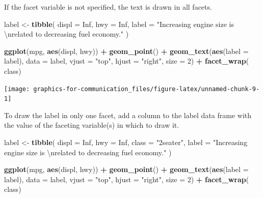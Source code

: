 \documentclass[]{book}
\newenvironment{Shaded}{\begin{snugshade}}{\end{snugshade}}
\newcommand{\CharTok}[1]{\textcolor[rgb]{0.31,0.60,0.02}{#1}}
\newcommand{\DataTypeTok}[1]{\textcolor[rgb]{0.13,0.29,0.53}{#1}}
\newcommand{\DecValTok}[1]{\textcolor[rgb]{0.00,0.00,0.81}{#1}}
\newcommand{\KeywordTok}[1]{\textcolor[rgb]{0.13,0.29,0.53}{\textbf{#1}}}
\newcommand{\NormalTok}[1]{#1}
\newcommand{\OperatorTok}[1]{\textcolor[rgb]{0.81,0.36,0.00}{\textbf{#1}}}
\newcommand{\OtherTok}[1]{\textcolor[rgb]{0.56,0.35,0.01}{#1}}
\newcommand{\StringTok}[1]{\textcolor[rgb]{0.31,0.60,0.02}{#1}}
\theoremstyle{plain}
\theoremstyle{remark}
\begin{document}
If the facet variable is not specified, the text is drawn in all facets.

\begin{Shaded}
\begin{Highlighting}[]
\NormalTok{label <-}\StringTok{ }\KeywordTok{tibble}\NormalTok{(}
  \DataTypeTok{displ =} \OtherTok{Inf}\NormalTok{,}
  \DataTypeTok{hwy =} \OtherTok{Inf}\NormalTok{,}
  \DataTypeTok{label =} \StringTok{"Increasing engine size is }\CharTok{\textbackslash{}n}\StringTok{related to decreasing fuel economy."}
\NormalTok{)}

\KeywordTok{ggplot}\NormalTok{(mpg, }\KeywordTok{aes}\NormalTok{(displ, hwy)) }\OperatorTok{+}
\StringTok{  }\KeywordTok{geom_point}\NormalTok{() }\OperatorTok{+}
\StringTok{  }\KeywordTok{geom_text}\NormalTok{(}\KeywordTok{aes}\NormalTok{(}\DataTypeTok{label =}\NormalTok{ label), }\DataTypeTok{data =}\NormalTok{ label, }\DataTypeTok{vjust =} \StringTok{"top"}\NormalTok{, }\DataTypeTok{hjust =} \StringTok{"right"}\NormalTok{,}
            \DataTypeTok{size =} \DecValTok{2}\NormalTok{) }\OperatorTok{+}
\StringTok{  }\KeywordTok{facet_wrap}\NormalTok{(}\OperatorTok{~}\StringTok{ }\NormalTok{class)}
\end{Highlighting}
\end{Shaded}

\begin{center}\texttt{[image: graphics-for-communication\_files/figure-latex/unnamed-chunk-9-1]} \end{center}

To draw the label in only one facet, add a column to the label data frame with the value of the faceting variable(s) in which to draw it.

\begin{Shaded}
\begin{Highlighting}[]
\NormalTok{label <-}\StringTok{ }\KeywordTok{tibble}\NormalTok{(}
  \DataTypeTok{displ =} \OtherTok{Inf}\NormalTok{,}
  \DataTypeTok{hwy =} \OtherTok{Inf}\NormalTok{,}
  \DataTypeTok{class =} \StringTok{"2seater"}\NormalTok{,}
  \DataTypeTok{label =} \StringTok{"Increasing engine size is }\CharTok{\textbackslash{}n}\StringTok{related to decreasing fuel economy."}
\NormalTok{)}

\KeywordTok{ggplot}\NormalTok{(mpg, }\KeywordTok{aes}\NormalTok{(displ, hwy)) }\OperatorTok{+}
\StringTok{  }\KeywordTok{geom_point}\NormalTok{() }\OperatorTok{+}
\StringTok{  }\KeywordTok{geom_text}\NormalTok{(}\KeywordTok{aes}\NormalTok{(}\DataTypeTok{label =}\NormalTok{ label), }\DataTypeTok{data =}\NormalTok{ label, }\DataTypeTok{vjust =} \StringTok{"top"}\NormalTok{, }\DataTypeTok{hjust =} \StringTok{"right"}\NormalTok{,}
            \DataTypeTok{size =} \DecValTok{2}\NormalTok{) }\OperatorTok{+}
\StringTok{  }\KeywordTok{facet_wrap}\NormalTok{(}\OperatorTok{~}\StringTok{ }\NormalTok{class)}
\end{Highlighting}
\end{Shaded}
\end{document}
